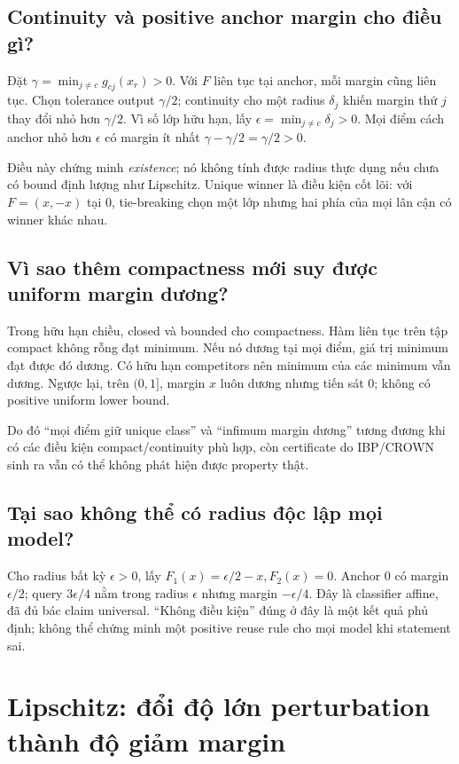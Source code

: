 \documentclass[11pt,a4paper]{article}
\theoremstyle{definition}
\begin{document}
\subsection{Continuity và positive anchor margin cho điều gì?}
Đặt $\gamma=\min_{j\ne c}g_{cj}(x_r)>0$. Với $F$ liên tục tại anchor, mỗi margin
cũng liên tục. Chọn tolerance output $\gamma/2$; continuity cho một radius
$\delta_j$ khiến margin thứ $j$ thay đổi nhỏ hơn $\gamma/2$. Vì số lớp hữu
hạn, lấy $\epsilon=\min_{j\ne c}\delta_j>0$. Mọi điểm cách anchor nhỏ hơn
$\epsilon$ có margin ít nhất $\gamma-\gamma/2=\gamma/2>0$.

Điều này chứng minh \emph{existence}; nó không tính được radius thực dụng
nếu chưa có bound định lượng như Lipschitz. Unique winner là điều kiện
cốt lõi: với $F=(x,-x)$ tại 0, tie-breaking chọn một lớp nhưng hai phía
của mọi lân cận có winner khác nhau.

\subsection{Vì sao thêm compactness mới suy được uniform margin dương?}
Trong hữu hạn chiều, closed và bounded cho compactness. Hàm liên tục trên
tập compact không rỗng đạt minimum. Nếu nó dương tại mọi điểm, giá trị
minimum đạt được đó dương. Có hữu hạn competitors nên minimum của các
minimum vẫn dương. Ngược lại, trên $(0,1]$, margin $x$ luôn dương nhưng
tiến sát 0; không có positive uniform lower bound.

Do đó ``mọi điểm giữ unique class'' và ``infimum margin dương'' tương
đương khi có các điều kiện compact/continuity phù hợp, còn certificate do
IBP/CROWN sinh ra vẫn có thể không phát hiện được property thật.

\subsection{Tại sao không thể có radius độc lập mọi model?}
Cho radius bất kỳ $\epsilon>0$, lấy $F_1(x)=\epsilon/2-x,F_2(x)=0$.
Anchor 0 có margin $\epsilon/2$; query $3\epsilon/4$ nằm trong radius
$\epsilon$ nhưng margin $-\epsilon/4$. Đây là classifier affine, đã đủ bác
claim universal. ``Không điều kiện'' đúng ở đây là một kết quả phủ định;
không thể chứng minh một positive reuse rule cho mọi model khi statement sai.

\section{Lipschitz: đổi độ lớn perturbation thành độ giảm margin}
\end{document}

